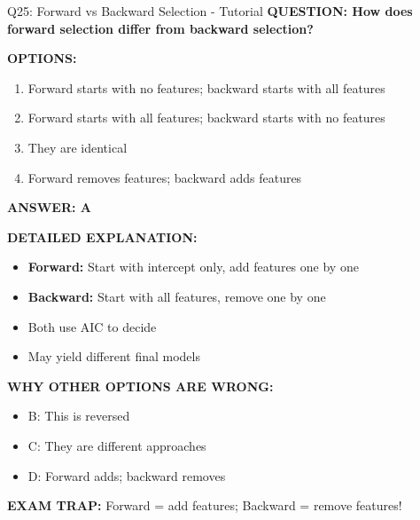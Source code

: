\documentclass[8pt]{beamer}
\begin{document}
	\begin{frame}{Q25: Forward vs Backward Selection - Tutorial}
		\fontsize{6.5}{7.5}\selectfont
		\textbf{QUESTION: How does forward selection differ from backward selection?}
		
		\vspace{0.1cm}
		\textbf{OPTIONS:}
		\begin{enumerate}
			\item Forward starts with no features; backward starts with all features
			\item Forward starts with all features; backward starts with no features
			\item They are identical
			\item Forward removes features; backward adds features
		\end{enumerate}
		
		\vspace{0.1cm}
		\textcolor{myblue}{\textbf{ANSWER: A}}
		
		\vspace{0.1cm}
		\textbf{DETAILED EXPLANATION:}
		\begin{itemize}
			\item \textbf{Forward:} Start with intercept only, add features one by one
			\item \textbf{Backward:} Start with all features, remove one by one
			\item Both use AIC to decide
			\item May yield different final models
		\end{itemize}
		
		\vspace{0.1cm}
		\textcolor{myred}{\textbf{WHY OTHER OPTIONS ARE WRONG:}}
		\begin{itemize}
			\item \textcolor{myred}{B:} This is reversed
			\item \textcolor{myred}{C:} They are different approaches
			\item \textcolor{myred}{D:} Forward adds; backward removes
		\end{itemize}
		
		\textcolor{myred}{\textbf{EXAM TRAP:}} Forward = \textcolor{myblue}{add features}; Backward = \textcolor{myblue}{remove features}!
	\end{frame}
	
	
\end{document}
